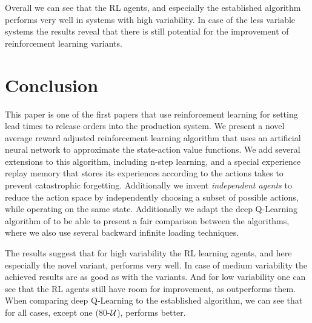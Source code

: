 \documentclass[envcountsame]{llncs}
\begin{document}
Overall we can see that the RL agents, and especially the established \ARA{} algorithm performs very
well in systems with high variability. In case of the less variable systems the results reveal that
there is still potential for the improvement of reinforcement learning variants.


\section{Conclusion}
\label{sec:conclusion}


This paper is one of the first papers that use reinforcement learning for setting lead times to
release orders into the production system. We present a novel average reward adjusted reinforcement
learning algorithm that uses an artificial neural network to approximate the state-action value
functions. We add several extensions to this algorithm, including n-step learning, and a special
experience replay memory that stores its experiences according to the actions takes to prevent
catastrophic forgetting. Additionally we invent \textit{independent agents} to reduce the action
space by independently choosing a subset of possible actions, while operating on the same state.
Additionally we adapt the deep Q-Learning algorithm of \citet{mnih2015human} to be able to present a
fair comparison between the algorithms, where we also use several backward infinite loading
techniques.

The results suggest that for high variability the RL learning agents, and here especially the novel
\ARA{} variant, performs very well. In case of medium variability the achieved results are as good
as with the \BIL{} variants. And for low variability one can see that the RL agents still have room
for improvement, as \BIL{} outperforms them. When comparing deep Q-Learning to the established
\ARA{} algorithm, we can see that for all cases, except one (80-\(\mathcal{U}\)), \ARA{} performs better.
\end{document}
